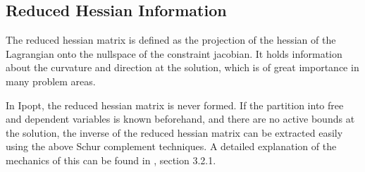 \documentclass[a4paper]{article}
\begin{document}
\subsection{Reduced Hessian Information}
The reduced hessian matrix is defined as the projection of the hessian of the Lagrangian onto the nullspace of the constraint jacobian. It holds information about the curvature and direction at the solution, which is of great importance in many problem areas.

In Ipopt, the reduced hessian matrix is never formed. If the partition into free and dependent variables is known beforehand, and there are no active bounds at the solution, the inverse of the reduced hessian matrix can be extracted easily using the above Schur complement techniques. A detailed explanation of the mechanics of this can be found in \cite{ZavalaPhd}, section 3.2.1. 


\end{document}
